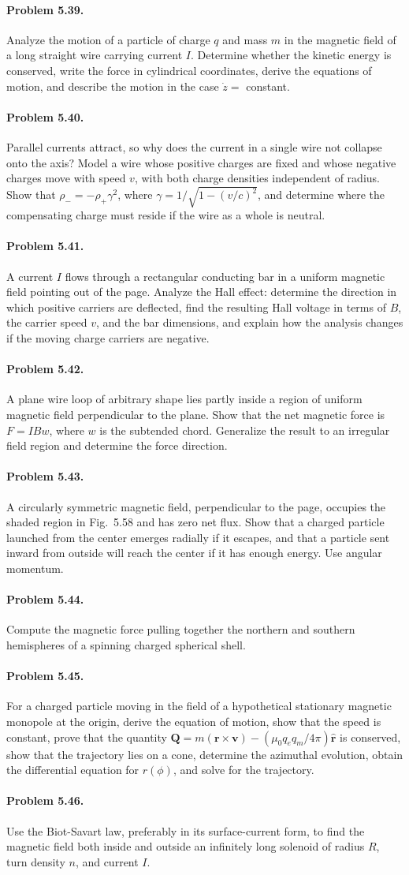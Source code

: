 \documentclass{aa}
\newcommand{\problemstatement}[2]{%
\paragraph{Problem #1.}#2\par\medskip
}
\begin{document}
\problemstatement{5.39}{Analyze the motion of a particle of charge \(q\) and mass \(m\) in the magnetic field of a long straight wire carrying current \(I\). Determine whether the kinetic energy is conserved, write the force in cylindrical coordinates, derive the equations of motion, and describe the motion in the case \(\dot z=\) constant.}
\problemstatement{5.40}{Parallel currents attract, so why does the current in a single wire not collapse onto the axis? Model a wire whose positive charges are fixed and whose negative charges move with speed \(v\), with both charge densities independent of radius. Show that \(\rho_-=-\rho_+\gamma^2\), where \(\gamma = 1/\sqrt{1-(v/c)^2}\), and determine where the compensating charge must reside if the wire as a whole is neutral.}
\problemstatement{5.41}{A current \(I\) flows through a rectangular conducting bar in a uniform magnetic field pointing out of the page. Analyze the Hall effect: determine the direction in which positive carriers are deflected, find the resulting Hall voltage in terms of \(B\), the carrier speed \(v\), and the bar dimensions, and explain how the analysis changes if the moving charge carriers are negative.}
\problemstatement{5.42}{A plane wire loop of arbitrary shape lies partly inside a region of uniform magnetic field perpendicular to the plane. Show that the net magnetic force is \(F=IBw\), where \(w\) is the subtended chord. Generalize the result to an irregular field region and determine the force direction.}
\problemstatement{5.43}{A circularly symmetric magnetic field, perpendicular to the page, occupies the shaded region in Fig.~5.58 and has zero net flux. Show that a charged particle launched from the center emerges radially if it escapes, and that a particle sent inward from outside will reach the center if it has enough energy. Use angular momentum.}
\problemstatement{5.44}{Compute the magnetic force pulling together the northern and southern hemispheres of a spinning charged spherical shell.}
\problemstatement{5.45}{For a charged particle moving in the field of a hypothetical stationary magnetic monopole at the origin, derive the equation of motion, show that the speed is constant, prove that the quantity \(\mathbf Q = m(\mathbf r\times\mathbf v)-(\mu_0 q_e q_m/4\pi)\hat{\mathbf r}\) is conserved, show that the trajectory lies on a cone, determine the azimuthal evolution, obtain the differential equation for \(r(\phi)\), and solve for the trajectory.}
\problemstatement{5.46}{Use the Biot-Savart law, preferably in its surface-current form, to find the magnetic field both inside and outside an infinitely long solenoid of radius \(R\), turn density \(n\), and current \(I\).}
\end{document}
